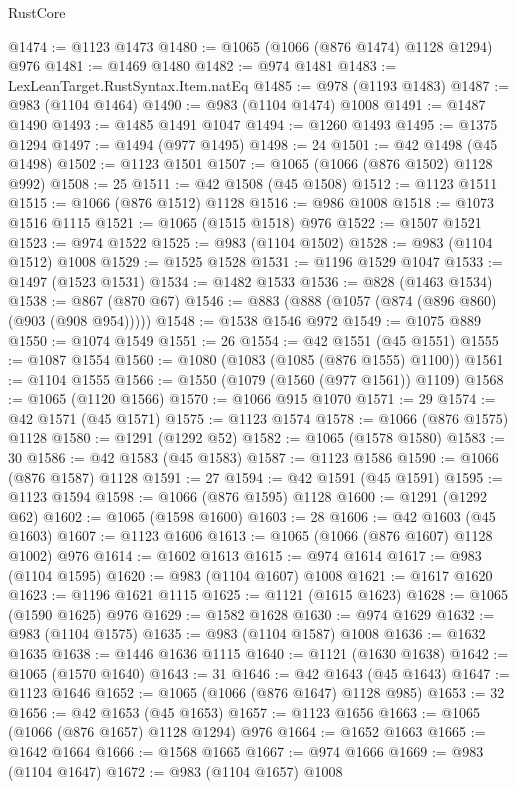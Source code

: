 \begin{lexlean}{RustCore}
\begin{coremodule}
@1474 := @1123 @1473
@1480 := @1065 (@1066 (@876 @1474) @1128 @1294) @976
@1481 := @1469 @1480
@1482 := @974 @1481
@1483 := LexLeanTarget.RustSyntax.Item.natEq
@1485 := @978 (@1193 @1483)
@1487 := @983 (@1104 @1464)
@1490 := @983 (@1104 @1474) @1008
@1491 := @1487 @1490
@1493 := @1485 @1491 @1047
@1494 := @1260 @1493
@1495 := @1375 @1294
@1497 := @1494 (@977 @1495)
@1498 := 24
@1501 := @42 @1498 (@45 @1498)
@1502 := @1123 @1501
@1507 := @1065 (@1066 (@876 @1502) @1128 @992)
@1508 := 25
@1511 := @42 @1508 (@45 @1508)
@1512 := @1123 @1511
@1515 := @1066 (@876 @1512) @1128
@1516 := @986 @1008
@1518 := @1073 @1516 @1115
@1521 := @1065 (@1515 @1518) @976
@1522 := @1507 @1521
@1523 := @974 @1522
@1525 := @983 (@1104 @1502)
@1528 := @983 (@1104 @1512) @1008
@1529 := @1525 @1528
@1531 := @1196 @1529 @1047
@1533 := @1497 (@1523 @1531)
@1534 := @1482 @1533
@1536 := @828 (@1463 @1534)
@1538 := @867 (@870 @67)
@1546 := @883 (@888 (@1057 (@874 (@896 @860) (@903 (@908 @954)))))
@1548 := @1538 @1546 @972
@1549 := @1075 @889
@1550 := @1074 @1549
@1551 := 26
@1554 := @42 @1551 (@45 @1551)
@1555 := @1087 @1554
@1560 := @1080 (@1083 (@1085 (@876 @1555) @1100))
@1561 := @1104 @1555
@1566 := @1550 (@1079 (@1560 (@977 @1561)) @1109)
@1568 := @1065 (@1120 @1566)
@1570 := @1066 @915 @1070
@1571 := 29
@1574 := @42 @1571 (@45 @1571)
@1575 := @1123 @1574
@1578 := @1066 (@876 @1575) @1128
@1580 := @1291 (@1292 @52)
@1582 := @1065 (@1578 @1580)
@1583 := 30
@1586 := @42 @1583 (@45 @1583)
@1587 := @1123 @1586
@1590 := @1066 (@876 @1587) @1128
@1591 := 27
@1594 := @42 @1591 (@45 @1591)
@1595 := @1123 @1594
@1598 := @1066 (@876 @1595) @1128
@1600 := @1291 (@1292 @62)
@1602 := @1065 (@1598 @1600)
@1603 := 28
@1606 := @42 @1603 (@45 @1603)
@1607 := @1123 @1606
@1613 := @1065 (@1066 (@876 @1607) @1128 @1002) @976
@1614 := @1602 @1613
@1615 := @974 @1614
@1617 := @983 (@1104 @1595)
@1620 := @983 (@1104 @1607) @1008
@1621 := @1617 @1620
@1623 := @1196 @1621 @1115
@1625 := @1121 (@1615 @1623)
@1628 := @1065 (@1590 @1625) @976
@1629 := @1582 @1628
@1630 := @974 @1629
@1632 := @983 (@1104 @1575)
@1635 := @983 (@1104 @1587) @1008
@1636 := @1632 @1635
@1638 := @1446 @1636 @1115
@1640 := @1121 (@1630 @1638)
@1642 := @1065 (@1570 @1640)
@1643 := 31
@1646 := @42 @1643 (@45 @1643)
@1647 := @1123 @1646
@1652 := @1065 (@1066 (@876 @1647) @1128 @985)
@1653 := 32
@1656 := @42 @1653 (@45 @1653)
@1657 := @1123 @1656
@1663 := @1065 (@1066 (@876 @1657) @1128 @1294) @976
@1664 := @1652 @1663
@1665 := @1642 @1664
@1666 := @1568 @1665
@1667 := @974 @1666
@1669 := @983 (@1104 @1647)
@1672 := @983 (@1104 @1657) @1008

\end{coremodule}
\end{lexlean}
